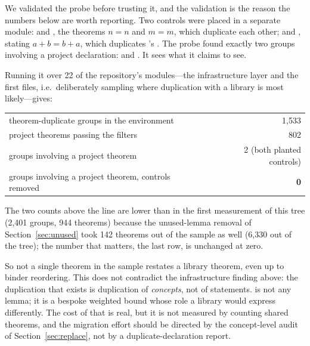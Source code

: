 We validated the probe before trusting it, and the validation is the reason the numbers
below are worth reporting. Two controls were placed in a separate module: 
and , the theorems $n=n$ and $m=m$, which duplicate each other; and
, stating $a+b=b+a$, which duplicates \Mathlib's .
The probe found exactly two groups involving a project declaration:  and . It sees what it claims to see.

Running it over 22 of the repository's modules---the infrastructure layer and the first
 files, i.e.\ deliberately sampling where duplication with a library is
most likely---gives:

\begin{center}\small
\begin{tabular}{@{}lr@{}}
\toprule
theorem-duplicate groups in the environment & 1{,}533 \\
project theorems passing the filters & 802 \\
groups involving a project theorem & 2 (both planted controls) \\
groups involving a project theorem, controls removed & \textbf{0} \\
\bottomrule
\end{tabular}
\end{center}

The two counts above the line are lower than in the first measurement of this tree (2{,}401
groups, 944 theorems) because the unused-lemma removal of Section~\ref{sec:unused} took
142 theorems out of the sample as well (6{,}330 out of the tree); the number that matters,
the last row, is unchanged at zero.

So not a single theorem in the sample restates a library theorem, even up to binder
reordering. This does not contradict the infrastructure finding above: the duplication that
exists is duplication of \emph{concepts}, not of statements. 
is not any \Mathlib{} lemma; it is a bespoke weighted bound whose role a library would
express differently. The cost of that is real, but it is not measured by counting shared
theorems, and the migration effort should be directed by the concept-level audit of
Section~\ref{sec:replace}, not by a duplicate-declaration report.


